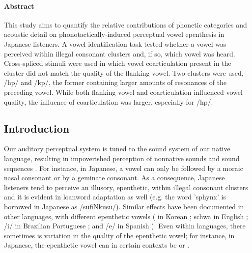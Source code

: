 \paragraph{Abstract}

This study aims to quantify the relative contributions of phonetic categories and acoustic detail on phonotactically-induced perceptual vowel epenthesis in Japanese listeners. A vowel identification task tested whether a vowel was perceived within illegal consonant clusters and, if so, which vowel was heard. Cross-spliced stimuli were used in which vowel coarticulation present in the cluster did not match the quality of the flanking vowel. Two clusters were used, /hp/ and /kp/, the former containing larger amounts of resonances of the preceding vowel. While both flanking vowel and coarticulation influenced vowel quality, the influence of coarticulation was larger, especially for /hp/.

\subsection{Introduction}

\setlength{\parindent}{5ex}

Our auditory perceptual system is tuned to the sound system of our native language, resulting in impoverished perception of nonnative sounds and sound sequences \cite{sebastian2005}. For instance, in Japanese, a vowel can only be followed by a moraic nasal consonant or by a geminate consonant. As a consequence, Japanese listeners tend to perceive an illusory, epenthetic,  within illegal consonant clusters \cite{dupoux1999, dehaene2000, dupoux2001, monahan2009, dupoux2011, guekozIS17} and it is evident in loanword adaptation as well (e.g. the word 'sphynx' is borrowed in Japanese as /sufiNkusu/). Similar effects have been documented in other languages, with different epenthetic vowels ( in Korean \cite{kabak2007, berent2008, dejong2012}; schwa in English \cite{berent2007, davidson2012}; /i/ in Brazilian Portuguese \cite{dupoux2011, guekozIS17}; and /e/ in Spanish \cite{halle2014}). Even within languages, there sometimes is variation in the quality of the epenthetic vowel; for instance, in Japanese, the epenthetic vowel can in certain contexts be  or  \cite{mattingley2015, guekozIS17}.

